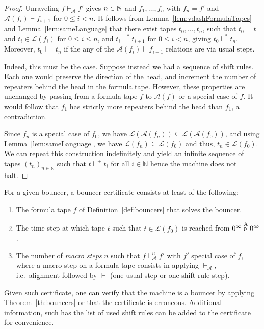 \begin{proof}
    Unraveling $f \vdash_\mathcal{A}^+ f'$ gives $n\in\mathbb{N}$ and $f_1, \dots, f_n$ with $f_n = f'$ and $\mathcal{A}(f_i) \vdash f_{i+1}$ for $0 \leq i < n$.
    It follows from Lemma~\ref{lem:vdashFormulaTapes} and Lemma~\ref{lem:sameLanguage} that there exist tapes $t_0, \dots, t_n$, such that $t_0 = t$ and $t_i\in \mathcal{L}(f_i)$ for $0 \leq i \leq n$, and $t_i \vdash^* t_{i+1}$ for $0 \leq i < n$, giving $t_0 \vdash^* t_n$. Moreover, $t_0 \vdash^+ t_n$ if the any of the $\mathcal{A}(f_i) \vdash f_{i+1}$ relations are via usual steps.

    Indeed, this must be the case. Suppose instead we had a sequence of shift rules. Each one would preserve the direction of the head, and increment the number of repeaters behind the head in the formula tape. However, these properties are unchanged by passing from a formula tape $f$ to $\mathcal{A}(f)$ or a special case of $f$. It would follow that $f_1$ has strictly more repeaters behind the head than $f_1$, a contradiction.

    Since $f_n$ is a special case of $f_0$, we have $\mathcal{L}(\mathcal{A}(f_n)) \subseteq \mathcal{L}(\mathcal{A}(f_0))$, and using Lemma~\ref{lem:sameLanguage}, we have $\mathcal{L}(f_n) \subseteq \mathcal{L}(f_0)$ and thus, $t_n \in \mathcal{L}(f_0)$. We can repeat this construction indefinitely and yield an infinite sequence of tapes $(t_n)_{n\in\mathbb{N}}$ such that $t \vdash^+ t_i$ for all $i\in\mathbb{N}$ hence the machine does not halt.
\end{proof}



\begin{definition}\label{def:bouncer-certificate}
    For a given bouncer, a bouncer certificate consists at least of the following:
    \begin{enumerate}
        \item The formula tape $f$ of Definition~\ref{def:bouncers} that solves the bouncer.
        \item The time step at which tape $t$ such that $t\in\mathcal{L}(f_0)$ is reached from  $0^\infty \stackrel{\text{A}}\triangleright 0^\infty$.
        \item The number of \textit{macro steps} $n$ such that $f \vdash_\mathcal{A}^n f'$ with $f'$ special case of $f$, where a macro step on a formula tape consists in applying $\vdash_\mathcal{A}$, i.e.\ alignment followed by $\vdash$ (one usual step or one shift rule step).
    \end{enumerate}
    Given such certificate, one can verify that the machine is a bouncer by applying Theorem~\ref{th:bouncers} or that the certificate is erroneous. Additional information, such has the list of used shift rules can be added to the certificate for convenience.
\end{definition}

